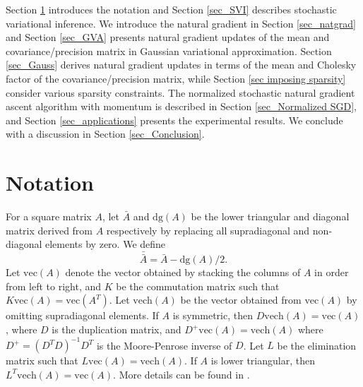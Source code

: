 \documentclass{statsoc}
\newcommand\dg{{\text{dg}}}
\newcommand{\vc}{\text{vec}}
\newcommand{\vech}{\text{vech}}
\begin{document}
Section \ref{sec_notation} introduces the notation and Section \ref{sec_SVI} describes stochastic variational inference. We introduce the natural gradient in Section \ref{sec_natgrad} and Section \ref{sec_GVA} presents natural gradient updates of the mean and covariance/precision matrix in Gaussian variational approximation. Section \ref{sec_Gauss} derives natural gradient updates in terms of the mean and Cholesky factor of the covariance/precision matrix, while Section \ref{sec imposing sparsity} consider various sparsity constraints. The normalized stochastic natural gradient ascent algorithm with momentum is described in Section \ref{sec_Normalized SGD}, and Section \ref{sec_applications} presents the experimental results. We conclude with a discussion in Section \ref{sec_Conclusion}. 



\section{Notation} \label{sec_notation}
For a square matrix $A$, let $\bar{A}$ and $\dg(A)$ be the lower triangular and diagonal matrix derived from $A$ respectively by replacing all supradiagonal and  non-diagonal elements by zero. We define
\[
\bar{\bar{A}} = \bar{A} - \dg(A)/2.
\]
Let $\vc(A)$ denote the vector obtained by stacking the columns of $A$ in order from left to right, and $K$ be the commutation matrix such that $K \vc(A) = \vc(A^T)$. Let $\vech(A)$ be the vector obtained from $\vc(A)$ by omitting supradiagonal elements. If $A$ is symmetric, then $D \vech(A) = \vc(A)$, where $D$ is the duplication matrix, and $D^+ \vc(A) = \vech(A)$ where $D^+ = (D^T D)^{-1} D^T$ is the Moore-Penrose inverse of $D$. Let $L$ be the elimination matrix such that $L \vc(A) = \vech(A)$. If $A$ is lower triangular, then $L^T \vech(A) = \vc(A)$. More details can be found in \cite{Magnus1980, Magnus2019}. 
\end{document}
